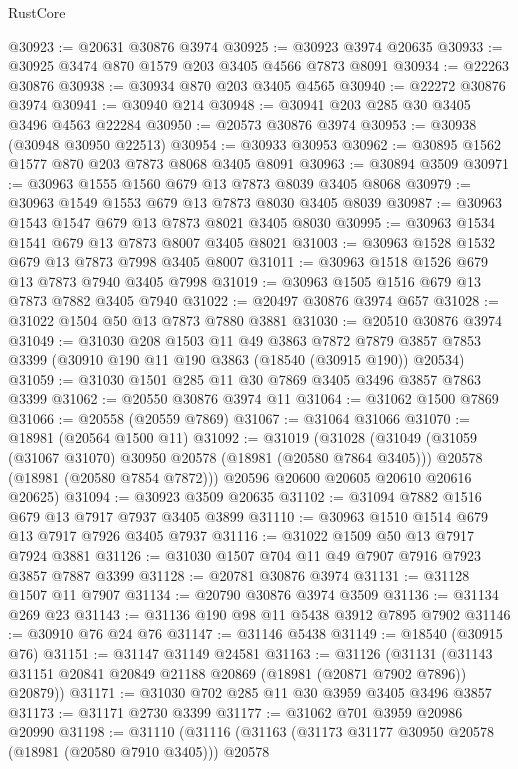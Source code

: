 \begin{lexlean}{RustCore}
\begin{coremodule}
@30923 := @20631 @30876 @3974
@30925 := @30923 @3974 @20635
@30933 := @30925 @3474 @870 @1579 @203 @3405 @4566 @7873 @8091
@30934 := @22263 @30876
@30938 := @30934 @870 @203 @3405 @4565
@30940 := @22272 @30876 @3974
@30941 := @30940 @214
@30948 := @30941 @203 @285 @30 @3405 @3496 @4563 @22284
@30950 := @20573 @30876 @3974
@30953 := @30938 (@30948 @30950 @22513)
@30954 := @30933 @30953
@30962 := @30895 @1562 @1577 @870 @203 @7873 @8068 @3405 @8091
@30963 := @30894 @3509
@30971 := @30963 @1555 @1560 @679 @13 @7873 @8039 @3405 @8068
@30979 := @30963 @1549 @1553 @679 @13 @7873 @8030 @3405 @8039
@30987 := @30963 @1543 @1547 @679 @13 @7873 @8021 @3405 @8030
@30995 := @30963 @1534 @1541 @679 @13 @7873 @8007 @3405 @8021
@31003 := @30963 @1528 @1532 @679 @13 @7873 @7998 @3405 @8007
@31011 := @30963 @1518 @1526 @679 @13 @7873 @7940 @3405 @7998
@31019 := @30963 @1505 @1516 @679 @13 @7873 @7882 @3405 @7940
@31022 := @20497 @30876 @3974 @657
@31028 := @31022 @1504 @50 @13 @7873 @7880 @3881
@31030 := @20510 @30876 @3974
@31049 := @31030
    @208
    @1503
    @11
    @49
    @3863
    @7872
    @7879
    @3857
    @7853
    @3399
    (@30910 @190 @11 @190 @3863 (@18540 (@30915 @190)) @20534)
@31059 := @31030 @1501 @285 @11 @30 @7869 @3405 @3496 @3857 @7863 @3399
@31062 := @20550 @30876 @3974 @11
@31064 := @31062 @1500 @7869
@31066 := @20558 (@20559 @7869)
@31067 := @31064 @31066
@31070 := @18981 (@20564 @1500 @11)
@31092 := @31019
    (@31028
      (@31049
        (@31059 (@31067 @31070) @30950 @20578 (@18981 (@20580 @7864 @3405)))
        @20578
        (@18981 (@20580 @7854 @7872)))
      @20596
      @20600
      @20605
      @20610
      @20616
      @20625)
@31094 := @30923 @3509 @20635
@31102 := @31094 @7882 @1516 @679 @13 @7917 @7937 @3405 @3899
@31110 := @30963 @1510 @1514 @679 @13 @7917 @7926 @3405 @7937
@31116 := @31022 @1509 @50 @13 @7917 @7924 @3881
@31126 := @31030 @1507 @704 @11 @49 @7907 @7916 @7923 @3857 @7887 @3399
@31128 := @20781 @30876 @3974
@31131 := @31128 @1507 @11 @7907
@31134 := @20790 @30876 @3974 @3509
@31136 := @31134 @269 @23
@31143 := @31136 @190 @98 @11 @5438 @3912 @7895 @7902
@31146 := @30910 @76 @24 @76
@31147 := @31146 @5438
@31149 := @18540 (@30915 @76)
@31151 := @31147 @31149 @24581
@31163 := @31126
    (@31131 (@31143 @31151 @20841 @20849 @21188 @20869 (@18981 (@20871 @7902 @7896)) @20879))
@31171 := @31030 @702 @285 @11 @30 @3959 @3405 @3496 @3857
@31173 := @31171 @2730 @3399
@31177 := @31062 @701 @3959 @20986 @20990
@31198 := @31110
    (@31116
      (@31163
        (@31173 @31177 @30950 @20578 (@18981 (@20580 @7910 @3405)))
        @20578

\end{coremodule}
\end{lexlean}
